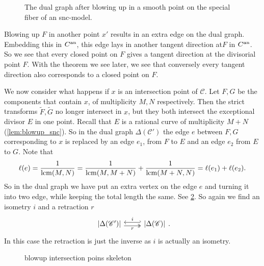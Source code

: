 \begin{figure}[ht]
    \centering
    \caption{The dual graph after blowing up in a smooth point on the special fiber of an snc-model. }
    \label{fig:blowup_smooth_point_skeleton}
\end{figure}

\begin{remark}
	Blowing up $ F$ in another point $x'$ results in an extra edge on the dual graph. 
	Embedding this in $C{}^{\text{an}}$, this edge lays in another tangent direction at$F$ in $C{}^{\text{an}}$. 
	So we see that every closed point  on  $F$ gives a tangent direction at the divisorial point $F$. 
	With the theorem we see later, we see that conversely every tangent direction also corresponds to a closed point on $F$. 
\end{remark}


\medskip

We now consider what happens if $x$ is an intersection point of $\mathscr C$. 
Let $F, G$ be the components that contain $x$, of multiplicity $M, N$ respectively. 
Then the strict transforms $\tilde F, \tilde G$ no longer intersect in $x$, but they both intersect the exceptional divisor $E$ in one point. 
Recall that $E$ is a rational curve of multiplicity $M + N$ (\cref{lem:blowup_snc}). 
So in the dual graph $\Delta(\mathscr C')$ the edge $e$ between $F, G$ corresponding to $x$ is replaced by an edge $e_1$, from $F$ to $E$ and an edge $e_2$ from $E$ to $G$. 
Note that \[
	\ell(e) = \frac{1}{\operatorname{lcm}(M, N)} = \frac{1}{\operatorname{lcm}(M, M + N)} + \frac{1}{\operatorname{lcm}(M+ N, N)} = \ell(e_1) + \ell(e_2)
.\]  
So in the dual graph we have put an extra vertex on the edge $e$ and turning it into two edge, while keeping the total length the same.
See \cref{fig:blowup_intersection_points_skeleton}. 
So again we find an isometry $i$ and a retraction $r$
\[
\begin{tikzcd}
	{|\Delta(\mathscr C')|} \rar[hookleftarrow, shift left]{i} \rar[twoheadrightarrow, shift right, ']{r} & {|\Delta(\mathscr C)|} 
\end{tikzcd}
.\] 
In this case the retraction is just the inverse as $i$ is actually an isometry. 

\begin{figure}[ht]
    \centering
    \caption{blowup intersection poins skeleton}
    \label{fig:blowup_intersection_points_skeleton}
\end{figure}

